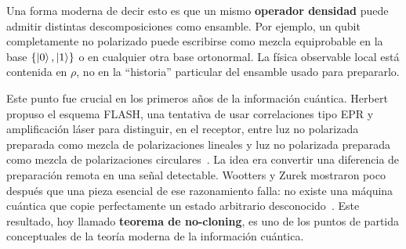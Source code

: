 \documentclass[12pt,a4paper]{article}
\theoremstyle{definition}
\theoremstyle{plain}
\theoremstyle{remark}
\begin{document}
Una forma moderna de decir esto es que un mismo \textbf{operador densidad} puede admitir distintas descomposiciones como ensamble. Por ejemplo, un qubit completamente no polarizado puede escribirse como mezcla equiprobable en la base $\{\ket{0},\ket{1}\}$ o en cualquier otra base ortonormal. La física observable local está contenida en $\rho$, no en la ``historia'' particular del ensamble usado para prepararlo.

Este punto fue crucial en los primeros años de la información cuántica. Herbert propuso el esquema FLASH, una tentativa de usar correlaciones tipo EPR y amplificación láser para distinguir, en el receptor, entre luz no polarizada preparada como mezcla de polarizaciones lineales y luz no polarizada preparada como mezcla de polarizaciones circulares~\cite{HerbertFLASH}. La idea era convertir una diferencia de preparación remota en una señal detectable. Wootters y Zurek mostraron poco después que una pieza esencial de ese razonamiento falla: no existe una máquina cuántica que copie perfectamente un estado arbitrario desconocido~\cite{WoottersZurek1982}. Este resultado, hoy llamado \textbf{teorema de no-cloning}, es uno de los puntos de partida conceptuales de la teoría moderna de la información cuántica.
\end{document}
